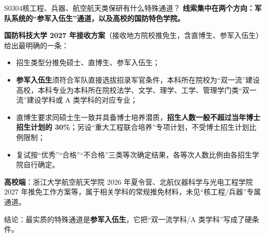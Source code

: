 \begin{qa}{S0304}{核工程、兵器、航空航天类保研有什么特殊通道？}
\textbf{线索集中在两个方向：军队系统的“参军入伍生”通道，以及高校的国防特色学院。}

\textbf{国防科技大学 2027 年接收方案}（接收地方院校推免生，含直博生、参军入伍生）给出最明确的一条：

\begin{itemize}
  \item 招生类型分推免硕士、直博生、参军入伍生；
  \item \textbf{参军入伍生}须符合军队直接选拔招录军官条件，本科所在院校为“双一流”建设高校，本科专业为本科所在院校法学、文学、理学、工学、管理学门类“双一流”建设学科或 A 类学科的对应专业；
  \item 直博生要求同硕士生一致并具备博士培养潜质，\textbf{招生人数一般不超过当年博士招生计划的 30\%}；另设“重大工程联合培养”专项计划，不受博士招生计划比例限制；
  \item 复试按“优秀”“合格”“不合格”三类等次确定结果，各等次人数比例由各招生学院自行确定。
\end{itemize}

\textbf{高校端}：浙江大学航空航天学院 2026 年夏令营、北航仪器科学与光电工程学院 2027 年推免工作方案等，属于相关学科的常规推免材料，未见“核工程/兵器”专属通道。

结论：最实质的特殊通道是\textbf{参军入伍生}，它把“双一流学科/A 类学科”写成了硬条件。
\end{qa}


